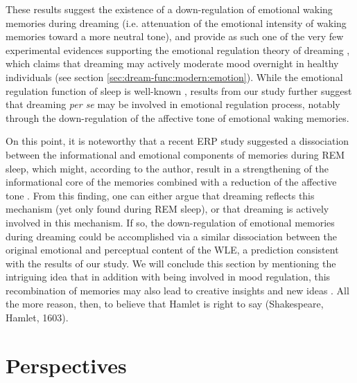 These results suggest the existence of a down-regulation of emotional waking memories during dreaming (i.e. attenuation of the emotional intensity of waking memories toward a more neutral tone), and provide as such one of the very few experimental evidences supporting the emotional regulation theory of dreaming \citep{cartwright_role_1998, cartwright_role_1998-1, perogamvros_roles_2012}, which claims that dreaming may actively moderate mood overnight in healthy individuals (see section \ref{sec:dream-func:modern:emotion}). While the emotional regulation function of sleep is well-known \citep{goldstein_role_2014}, results from our study further suggest that dreaming \emph{per se} may be involved in emotional regulation process, notably through the down-regulation of the affective tone of emotional waking memories.

On this point, it is noteworthy that a recent ERP study suggested a dissociation between the informational and emotional components of memories during REM sleep, which might, according to the author, result in a strengthening of the informational core of the memories combined with a reduction of the affective tone \citep{groch_role_2013}. From this finding, one can either argue that dreaming  reflects this mechanism (yet only found during REM sleep), or that dreaming is actively involved in this mechanism. If so, the down-regulation of emotional memories during dreaming could be accomplished via a similar dissociation between the original emotional and perceptual content of the WLE, a prediction consistent with the results of our study. We will conclude this section by mentioning the intriguing idea that in addition with being involved in mood regulation, this recombination of memories may also lead to creative insights and new ideas \citep{maquet_psychology:_2004, payne_sleep_2004, edwards_dreaming_2013, barrett_dreams_2017}. All the more reason, then, to believe that Hamlet is right to say  (Shakespeare, Hamlet, 1603).

\section{Perspectives}
\label{disc:drf:summary:perspectives}

